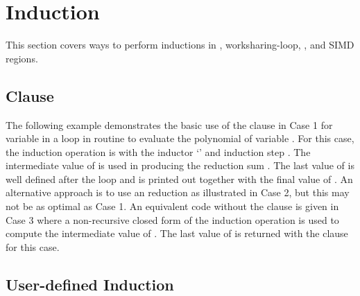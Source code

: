 
\section{Induction}
\label{sec:induction}

This section covers ways to perform inductions in , worksharing-loop, , and SIMD regions.

\subsection{ Clause}
\label{subsec:induction}

The following example demonstrates the basic use of the  clause
in Case 1 for variable  in a loop in routine  to 
evaluate the polynomial of variable .  
For this case, the induction operation is 
with the inductor `\scode{*}' and induction step .
The intermediate value of  is used in producing
the reduction sum .
The last value of  is well defined after the loop and 
is printed out together with the final value of .
An alternative approach is to use an  reduction
as illustrated in Case 2, but this may not be as optimal as Case 1.
An equivalent code without the  clause is given in Case 3
where a non-recursive closed form of the induction operation is used to 
compute the intermediate value of . 
The last value of  is returned with the  clause
for this case.



\subsection{User-defined Induction}
\label{subsec:user-defined-induction}



